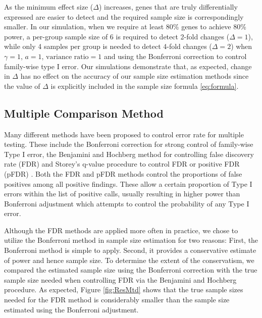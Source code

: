 \documentclass[12pt]{article}
\begin{document}
As the minimum effect size ($\Delta$) increases, genes that are
truly differentially expressed are easier to detect and the
required sample size is correspondingly smaller.  In our
simulation, when we require at least 80\% genes to achieve 80\%
power, a per-group sample size of 6 is required to detect 2-fold
changes ($\Delta = 1$), while only 4 samples per group is needed
to detect 4-fold changes ($\Delta = 2$) when $\gamma=1$, $a=1$,
$\text{variance ratio}=1$ and using the Bonferroni correction to
control family-wise type I error. Our simulations demonstrate
that, as expected, change in $\Delta$ has no effect on the
accuracy of our sample size estimation methods since the value of
$\Delta$ is explicitly included in the sample size formula
\ref{eq:formula}.

\subsection{Multiple Comparison Method}

Many different methods have been proposed to control error rate for
multiple testing.  These include the Bonferroni correction for
strong control of family-wise Type I error, the Benjamini and
Hochberg \citeyearpar{Benjamini95} method for controlling false
discovery rate (FDR) and Storey's \citeyearpar{Storey02} q-value
procedure to control FDR or positive FDR (pFDR) .  Both the FDR and
pFDR methods control the proportions of false positives among all
positive findings.  These allow a certain proportion of Type I
errors within the list of positive calls, usually resulting in
higher power than Bonferroni adjustment which attempts to control
the probability of any Type I error.

Although the FDR methods are applied more often in practice, we
chose to utilize the Bonferroni method in sample size estimation for
two reasons: First, the Bonferroni method is simple to apply.
Second, it provides a conservative estimate of power and hence
sample size.  To determine the extent of the conservatism, we
compared the estimated sample size using the Bonferroni correction
with the true sample size needed when controlling FDR via the
Benjamini and Hochberg \citeyearpar{Benjamini95} procedure. As
expected, Figure \ref{fig:ResMtd} shows that the true sample sizes
needed for the FDR method is considerably smaller than the sample
size estimated using the Bonferroni adjustment.
\end{document}
